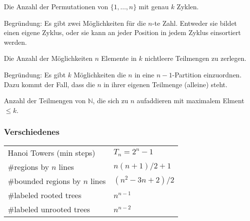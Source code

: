 \begin{bem}\label{bem:stirling1}
Die Anzahl der Permutationen von $\{1, \ldots, n\}$ mit genau $k$ Zyklen.

Begründung: Es gibt zwei Möglichkeiten für die $n$-te Zahl. Entweder sie bildet einen eigene Zyklus, oder sie kann an jeder Position in jedem Zyklus einsortiert werden.
\end{bem}

\begin{bem}\label{bem:stirling2}
Die Anzahl der Möglichkeiten $n$ Elemente in $k$ nichtleere Teilmengen zu zerlegen.

Begründung: Es gibt $k$ Möglichkeiten die $n$ in eine $n-1$-Partition einzuordnen. Dazu kommt der Fall, dass die $n$ in ihrer eigenen Teilmenge (alleine) steht.
\end{bem}

\begin{bem}\label{bem:integerPartitions}
Anzahl der Teilmengen von $\mathbb{N}$, die sich zu $n$ aufaddieren mit maximalem Elment $\leq k$.
\end{bem}

\subsubsection{Verschiedenes}
\begin{tabular}{|l|l|}
	\hline
	Hanoi Towers (min steps)		& $T_n = 2^n - 1$\\
	\#regions by $n$ lines			& $n\left(n + 1\right) / 2 + 1$\\
	\#bounded regions by $n$ lines		& $\left(n^2 - 3n + 2\right) / 2$\\
	\#labeled rooted trees			& $n^{n-1}$\\
	\#labeled unrooted trees		& $n^{n-2}$\\
	\hline
\end{tabular}
